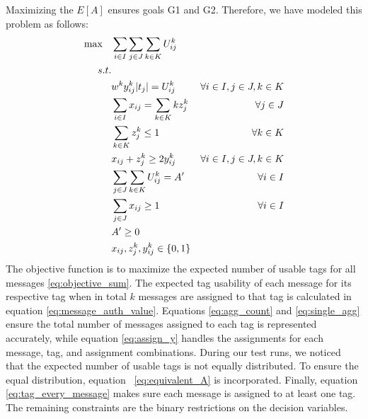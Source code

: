 Maximizing the $E[A]$ ensures  goals G1 and G2. Therefore, we have modeled this problem as follows:
\begin{align}
\text{max \hspace{.2cm}} & \sum\limits_{i \in I}\sum\limits_{j \in J}\sum\limits_{k \in K}  U_{ij}^k \label{eq:objective_sum} \\
\text{\hspace{.3cm}} s.t.  & \nonumber \\
& w^k y_{ij}^k |t_j|=  U_{ij}^k & \forall i \in I, j \in J, k \in K \label{eq:message_auth_value}\\
& \sum\limits_{i \in I} x_{ij} = \sum\limits_{k \in K} k z_{j}^k & \forall j \in J \label{eq:agg_count}\\
& \sum\limits_{k \in K} z_{j}^k \leq 1 & \forall k \in K \label{eq:single_agg}\\
& x_{ij} + z_{j}^k \geq 2 y_{ij}^k & \forall i \in I, j \in J, k \in K \label{eq:assign_y}\\
& \sum\limits_{j \in J} \sum\limits_{k \in K} U_{ij}^k = A^\prime & \forall i \in I \label{eq:equivalent_A}\\
& \sum\limits_{j \in J} x_{ij} \geq 1 & \forall i \in I \label{eq:tag_every_message}\\
& A^\prime \geq 0 \\
& x_{ij}, z_{j}^k, y_{ij}^k \in \{0,1\}  
\end{align}
The objective function is to maximize the expected number of usable tags for all messages \eqref{eq:objective_sum}. The expected tag usability of each message for its respective tag when in total $k$ messages are assigned to that tag is calculated in equation \eqref{eq:message_auth_value}. Equations \eqref{eq:agg_count} and \eqref{eq:single_agg} ensure the total number of messages assigned to each tag is represented accurately, while equation \eqref{eq:assign_y} handles the assignments for each message, tag, and assignment combinations. During our test runs, we noticed that the expected number of usable tags is not equally distributed. To ensure the equal distribution, equation ~\eqref{eq:equivalent_A} is incorporated. Finally, equation \eqref{eq:tag_every_message} makes sure each message is assigned to at least one tag. The remaining constraints are the binary restrictions on the decision variables.


